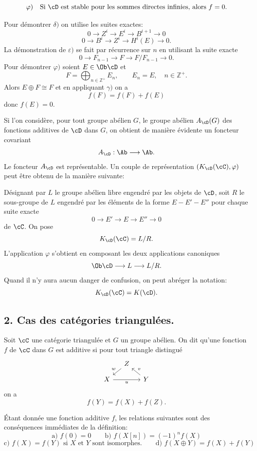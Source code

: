 \[
\varphi)\quad
\text{Si }\cD\text{ est stable pour les sommes directes infinies, alors }f=0.
\]

Pour démontrer $\delta)$ on utilise les suites exactes:
\[
0\longrightarrow Z^i\longrightarrow E^i\longrightarrow B^{i+1}\longrightarrow 0
\]
\[
0\longrightarrow B^i\longrightarrow Z^i\longrightarrow H^i(E)\longrightarrow 0.
\]
La démonstration de $\varepsilon)$ se fait par récurrence sur $n$ en utilisant la suite exacte
\[
0\longrightarrow F_{n-1}\longrightarrow F\longrightarrow F/F_{n-1}\longrightarrow 0.
\]
Pour démontrer $\varphi)$ soient $E\in\Ob\cD$ et
\[
F=\bigoplus_{n\in\mathbb{Z}^+}E_n,\qquad E_n=E,\quad n\in\mathbb{Z}^+.
\]
Alors $E\oplus F\cong F$ et en appliquant $\gamma)$ on a
\[
f(F)=f(F)+f(E)
\]
donc $f(E)=0$.

Si l'on considère, pour tout groupe abélien $G$, le groupe abélien $A_{\cD}(G)$ des fonctions additives de $\cD$ dans $G$, on obtient de manière évidente un foncteur covariant
\[
A_{\cD}:\Ab\longrightarrow\Ab.
\]
Le foncteur $A_{\cD}$ est représentable. Un couple de représentation $(K_{\cD}(\cC),\varphi)$ peut être obtenu de la manière suivante:

Désignant par $L$ le groupe abélien libre engendré par les objets de $\cD$, soit $R$ le sous-groupe de $L$ engendré par les éléments de la forme $E-E'-E''$ pour chaque suite exacte
\[
0\longrightarrow E'\longrightarrow E\longrightarrow E''\longrightarrow 0
\]
de $\cC$. On pose
\[
K_{\cD}(\cC)=L/R.
\]
L'application $\varphi$ s'obtient en composant les deux applications canoniques
\[
\Ob\cD\longrightarrow L\longrightarrow L/R.
\]
Quand il n'y aura aucun danger de confusion, on peut abréger la notation:
\[
K_{\cD}(\cC)=K(\cD).
\]

\subsection*{2. Cas des catégories triangulées.}

Soit $\cC$ une catégorie triangulée et $G$ un groupe abélien. On dit qu'une fonction $f$ de $\cC$ dans $G$ est additive si pour tout triangle distingué
\[
\begin{tikzcd}[column sep=small,row sep=small]
& Z \arrow[dl,"w"']\\
X \arrow[rr,"u"'] && Y \arrow[ul,"v"']
\end{tikzcd}
\]
on a
\[
f(Y)=f(X)+f(Z).
\]

Étant donnée une fonction additive $f$, les relations suivantes sont des conséquences immédiates de la définition:
\[
\text{a) } f(0)=0\qquad
\text{b) } f(X[n])=(-1)^n f(X)
\]
\[
\text{c) } f(X)=f(Y)\text{ si }X\text{ et }Y\text{ sont isomorphes.}
\qquad
\text{d) } f(X\oplus Y)=f(X)+f(Y)
\]

